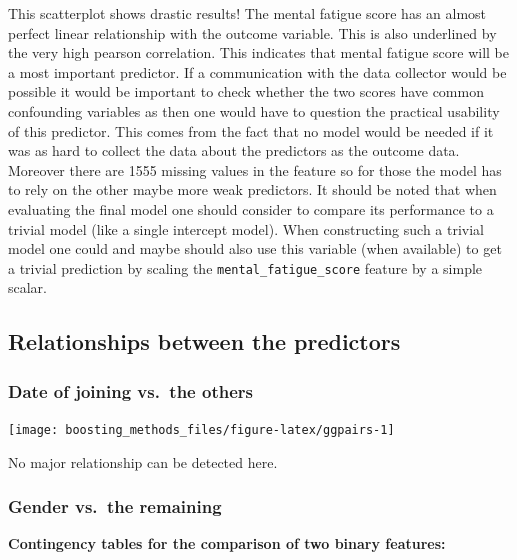 \documentclass[
]{book}
\newenvironment{Shaded}{\begin{snugshade}}{\end{snugshade}}
\newcommand{\CommentTok}[1]{\textcolor[rgb]{0.56,0.35,0.01}{\textit{#1}}}
\newcommand{\FunctionTok}[1]{\textcolor[rgb]{0.00,0.00,0.00}{#1}}
\newcommand{\NormalTok}[1]{#1}
\newcommand{\SpecialCharTok}[1]{\textcolor[rgb]{0.00,0.00,0.00}{#1}}
\begin{document}
This scatterplot shows drastic results! The mental fatigue score has an almost perfect linear relationship with the outcome variable. This is also underlined by the very high pearson correlation. This indicates that mental fatigue score will be a most important predictor. If a communication with the data collector would be possible it would be important to check whether the two scores have common confounding variables as then one would have to question the practical usability of this predictor. This comes from the fact that no model would be needed if it was as hard to collect the data about the predictors as the outcome data. Moreover there are 1555 missing values in the feature so for those the model has to rely on the other maybe more weak predictors. It should be noted that when evaluating the final model one should consider to compare its performance to a trivial model (like a single intercept model). When constructing such a trivial model one could and maybe should also use this variable (when available) to get a trivial prediction by scaling the \texttt{mental\_fatigue\_score} feature by a simple scalar.

\hypertarget{relationships-between-the-predictors}{%
\subsection{Relationships between the predictors}\label{relationships-between-the-predictors}}

\hypertarget{date-of-joining-vs.-the-others}{%
\subsubsection{Date of joining vs.~the others}\label{date-of-joining-vs.-the-others}}

\texttt{[image: boosting\_methods\_files/figure-latex/ggpairs-1]}

No major relationship can be detected here.

\hypertarget{gender-vs.-the-remaining}{%
\subsubsection{Gender vs.~the remaining}\label{gender-vs.-the-remaining}}

\textbf{Contingency tables for the comparison of two binary features:}

\begin{Shaded}
\end{Shaded}
\end{document}
